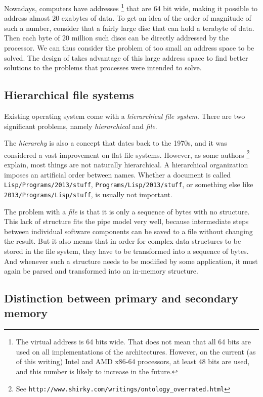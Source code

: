 Nowadays, computers have addresses%
\footnote{The virtual address is 64 bits wide.  That does not mean
  that all 64 bits are used on all implementations of the
  architectures.  However, on the current (as of this writing) Intel
  and AMD x86-64 processors, at least 48 bits are used, and this
  number is likely to increase in the future.}
that are 64 bit wide, making it possible to address almost 20 exabytes
of data.  To get an idea of the order of magnitude of such a number,
consider that a fairly large disc that can hold a terabyte of data.
Then each byte of 20 million such discs can be directly addressed by
the processor.  We can thus consider the problem of too small an
address space to be solved.  The design of \sysname{} takes advantage
of this large address space to find better solutions to the problems
that processes were intended to solve.

\subsection{Hierarchical file systems}

Existing operating system come with a \emph{hierarchical file
system}.  There are two significant problems,
namely \emph{hierarchical} and \emph{file}.

The \emph{ hierarchy} is also a concept that dates back to the
1970s, and it was considered a vast improvement on flat file
systems.  However, as some authors%
\footnote{See
  \texttt{http://www.shirky.com/writings/ontology\_overrated.html}}
explain, most things are not naturally hierarchical.  A hierarchical
organization imposes an artificial order between names.  Whether a
document is called \texttt{Lisp/Programs/2013/stuff},
\texttt{Programs/Lisp/2013/stuff}, or something else like
\texttt{2013/Programs/Lisp/stuff}, is usually not important.

The problem with a \emph{file} is that it is only a sequence of
bytes with no structure.  This lack of structure fits the \unix{} pipe
model very well, because intermediate steps between individual
software components can be saved to a file without changing the
result.  But it also means that in order for complex data structures
to be stored in the file system, they have to be transformed into a
sequence of bytes.  And whenever such a structure needs to be
modified by some application, it must again be parsed and
transformed into an in-memory structure.

\subsection{Distinction between primary and secondary memory}

